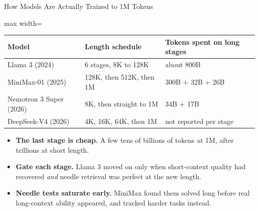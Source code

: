 \begin{frame}{How Models Are Actually Trained to 1M Tokens}
    \begin{center}
    \small
    \renewcommand{\arraystretch}{1.25}
    \begin{adjustbox}{max width=\linewidth}\begin{tabular}{lll}
        \toprule
        \textbf{Model} & \textbf{Length schedule} & \textbf{Tokens spent on long stages} \\
        \midrule
        Llama 3 (2024) & 6 stages, 8K to 128K & about 800B \\
        MiniMax-01 (2025) & 128K, then 512K, then 1M & 300B + 32B + 26B \\
        Nemotron 3 Super (2026) & 8K, then straight to 1M & 34B + 17B \\
        DeepSeek-V4 (2026) & 4K, 16K, 64K, then 1M & not reported per stage \\
        \bottomrule
    \end{tabular}\end{adjustbox}
    \end{center}
    \begin{itemize}\itemsep0.4em
        \item \textbf{The last stage is cheap.} A few tens of billions of tokens at 1M, after trillions at short length.
        \item \textbf{Gate each stage.} Llama 3 moved on only when short-context quality had recovered \emph{and} needle retrieval was perfect at the new length.
        \item \textbf{Needle tests saturate early.} MiniMax found them solved long before real long-context ability appeared, and tracked harder tasks instead.
    \end{itemize}
\end{frame}

